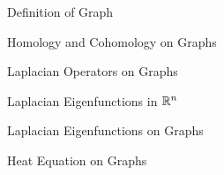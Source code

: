 \documentclass[../main.tex]{subfiles}
\begin{document}
    \begin{section}{Definition of Graph}
           
    \end{section}
    \begin{section}{Homology and Cohomology on Graphs}
        
    \end{section}
    \begin{section}{Laplacian Operators on Graphs}
        
    \end{section}
    \begin{section}{Laplacian Eigenfunctions in $\mathbb{R}^n$}
        
    \end{section}
    \begin{section}{Laplacian Eigenfunctions on Graphs}
        
    \end{section}
    \begin{section}{Heat Equation on Graphs}
        
    \end{section}
\end{document}
